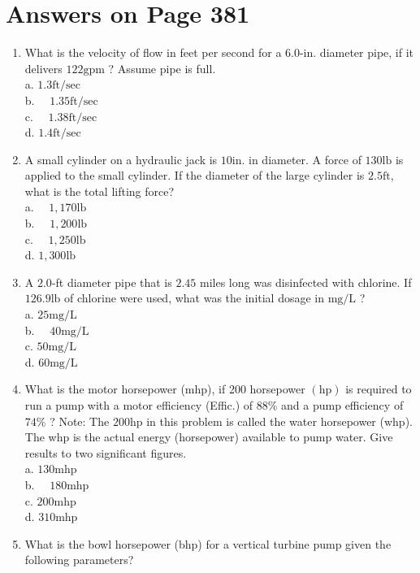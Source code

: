 \documentclass[10pt]{article}
\begin{document}
\section{Answers on Page 381}
\begin{enumerate}
  \item What is the velocity of flow in feet per second for a 6.0-in. diameter pipe, if it delivers $122 \mathrm{gpm}$ ? Assume pipe is full.\\
a. $1.3 \mathrm{ft} / \mathrm{sec}$\\
b. $\quad 1.35 \mathrm{ft} / \mathrm{sec}$\\
c. $\quad 1.38 \mathrm{ft} / \mathrm{sec}$\\
d. $1.4 \mathrm{ft} / \mathrm{sec}$

  \item A small cylinder on a hydraulic jack is $10 \mathrm{in}$. in diameter. A force of $130 \mathrm{lb}$ is applied to the small cylinder. If the diameter of the large cylinder is $2.5 \mathrm{ft}$, what is the total lifting force?\\
a. $\quad 1,170 \mathrm{lb}$\\
b. $\quad 1,200 \mathrm{lb}$\\
c. $\quad 1,250 \mathrm{lb}$\\
d. $1,300 \mathrm{lb}$

  \item A $2.0$-ft diameter pipe that is $2.45$ miles long was disinfected with chlorine. If $126.9 \mathrm{lb}$ of chlorine were used, what was the initial dosage in $\mathrm{mg} / \mathrm{L}$ ?\\
a. $25 \mathrm{mg} / \mathrm{L}$\\
b. $\quad 40 \mathrm{mg} / \mathrm{L}$\\
c. $50 \mathrm{mg} / \mathrm{L}$\\
d. $60 \mathrm{mg} / \mathrm{L}$

  \item What is the motor horsepower (mhp), if 200 horsepower $(\mathrm{hp})$ is required to run a pump with a motor efficiency (Effic.) of $88 \%$ and a pump efficiency of $74 \%$ ? Note: The $200 \mathrm{hp}$ in this problem is called the water horsepower (whp). The whp is the actual energy (horsepower) available to pump water. Give results to two significant figures.\\
a. $130 \mathrm{mhp}$\\
b. $\quad 180 \mathrm{mhp}$\\
c. $200 \mathrm{mhp}$\\
d. $310 \mathrm{mhp}$

  \item What is the bowl horsepower (bhp) for a vertical turbine pump given the following parameters?

\end{enumerate}
\end{document}
